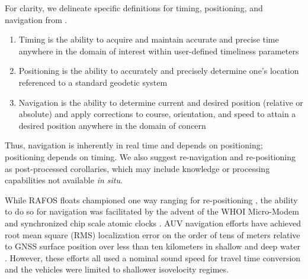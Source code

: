 
For clarity, we delineate specific definitions for timing, positioning, and navigation from \citet{howe_observing_2019}.
\begin{enumerate}
	\item Timing is the ability to acquire and maintain accurate and precise time anywhere in the domain of interest within user-defined timeliness parameters
	\item Positioning is the ability to accurately and precisely determine one's location referenced to a standard geodetic system
	\item Navigation is the ability to determine current and desired position (relative or absolute) and apply corrections to course, orientation, and speed to attain a desired position anywhere in the domain of concern
\end{enumerate}
Thus, navigation is inherently in real time and depends on positioning; positioning depends on timing.
We also suggest re-navigation and re-positioning as post-processed corollaries, which may include knowledge or processing capabilities not available \textit{in situ}.

While RAFOS floats championed one way ranging for re-positioning \citep{rossby_rafos_1986,duda_evaluation_2006}, the ability to do so for navigation was facilitated by  the advent of the WHOI Micro-Modem \citep{singh_underwater_2006} and synchronized chip scale atomic clocks \citep{gardner_second_2016}.
AUV navigation efforts have achieved root mean square (RMS) localization error on the order of tens of meters relative to GNSS surface position over less than ten kilometers in shallow \citep{eustice_experimental_2007,kepper_mems_2017,claus_closed-loop_2018} and deep water \citep{kunz2008deep,jakuba2008long,webster_preliminary_2009}.
However, these efforts all used a nominal sound speed for travel time conversion and the vehicles were limited to shallower isovelocity regimes.

